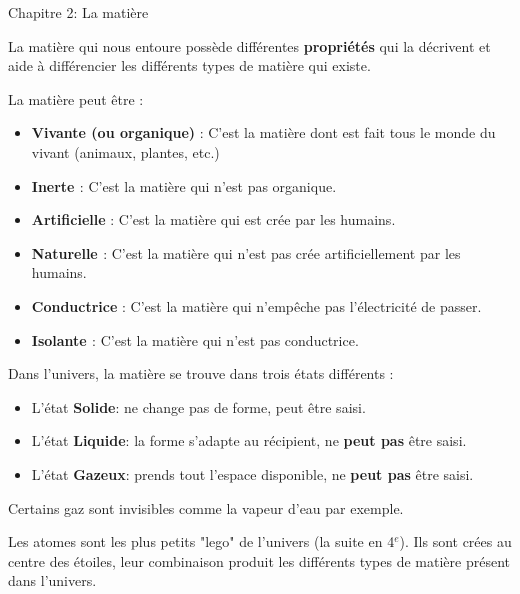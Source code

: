 \documentclass[24pt]{article}
\newcommand{\titre}{Chapitre 2: La matière} %
\begin{document}
\thispagestyle{fancy}
\cfoot{}

\begin{titlebox}{\titre}
    \setlength\parindent{4pt} %
    \setlength\parskip{5pt} 

    La matière qui nous entoure possède différentes \textbf{\color{DarkRed} {propriétés}} 
    qui la décrivent et aide à différencier les différents types de matière qui existe.

    La matière peut être : 
    \begin{itemize}
        \item \textbf{\color{DarkRed} {Vivante (ou organique)}} : 
        C'est la matière dont est fait tous le monde du vivant
        (animaux, plantes, etc.)
        \item \textbf{\color{DarkRed} {Inerte }} :
        C'est la matière qui n'est pas organique.
        \item \textbf{\color{DarkRed} {Artificielle}} : 
        C'est la matière qui est crée par les humains.
        \item \textbf{\color{DarkRed} {Naturelle }} :
        C'est la matière qui n'est pas crée artificiellement par les humains.
        \item \textbf{\color{DarkRed} {Conductrice}} :
        C'est la matière qui n'empêche pas l'électricité de passer.
        \item \textbf{\color{DarkRed} {Isolante }} :
        C'est la matière qui n'est pas conductrice.
    \end{itemize}
    
    \vspace{30pt}

    Dans l'univers, la matière se trouve dans trois états différents :
    \begin{itemize}
        \item L'état \textbf{\color{DarkRed} {Solide}}: ne change pas de forme, peut être saisi.
        \item L'état \textbf{\color{DarkRed} {Liquide}}: la forme s'adapte au récipient, ne \textbf{peut pas} être saisi.
        \item L'état \textbf{\color{DarkRed} {Gazeux}}: prends tout l'espace disponible, ne \textbf{peut pas} être saisi.
    \end{itemize}
    
    Certains gaz sont invisibles comme la vapeur d'eau par exemple.

    \vspace{30pt}
    Les atomes sont les plus petits "lego" de l'univers (la suite en 4$^{e}$).
    Ils sont crées au centre des étoiles, leur combinaison produit les différents types de matière
    présent dans l'univers.

\end{titlebox}
\end{document}
